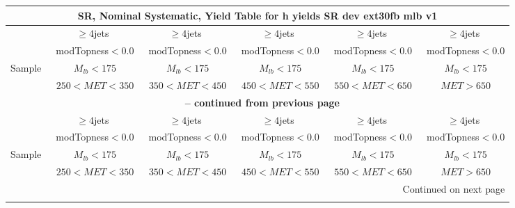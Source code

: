 \documentclass{article}
\begin{document}
\begin{longtable}{|l|c|c|c|c|c|} 
 
\multicolumn{6}{c}{ SR, Nominal Systematic, Yield Table for h yields SR dev ext30fb mlb v1 }\\* \hline 
  & $\ge4$jets  & $\ge4$jets  & $\ge4$jets  & $\ge4$jets  & $\ge4$jets \\* 
  & ~modTopness$<0.0$  & ~modTopness$<0.0$  & ~modTopness$<0.0$  & ~modTopness$<0.0$  & ~modTopness$<0.0$ \\* 
Sample  & ~$M_{lb}<175$  & ~$M_{lb}<175$  & ~$M_{lb}<175$  & ~$M_{lb}<175$  & ~$M_{lb}<175$ \\* 
  & ~$250<MET<350$  & ~$350<MET<450$  & ~$450<MET<550$  & ~$550<MET<650$  & ~$MET>650$ \\* 
\hline \hline 
\endfirsthead 
 
\multicolumn{6}{c}{{\bfseries \tablename\ \thetable{} -- continued from previous page}}\\* \hline 
  & $\ge4$jets  & $\ge4$jets  & $\ge4$jets  & $\ge4$jets  & $\ge4$jets \\* 
  & ~modTopness$<0.0$  & ~modTopness$<0.0$  & ~modTopness$<0.0$  & ~modTopness$<0.0$  & ~modTopness$<0.0$ \\* 
Sample  & ~$M_{lb}<175$  & ~$M_{lb}<175$  & ~$M_{lb}<175$  & ~$M_{lb}<175$  & ~$M_{lb}<175$ \\* 
  & ~$250<MET<350$  & ~$350<MET<450$  & ~$450<MET<550$  & ~$550<MET<650$  & ~$MET>650$ \\* 
\hline \hline 
\endhead 
 
\multicolumn{6}{|r|}{{Continued on next page}}\\* \hline 
\endfoot 
 
 
\endlastfoot 
 

\end{longtable}
\end{document}
